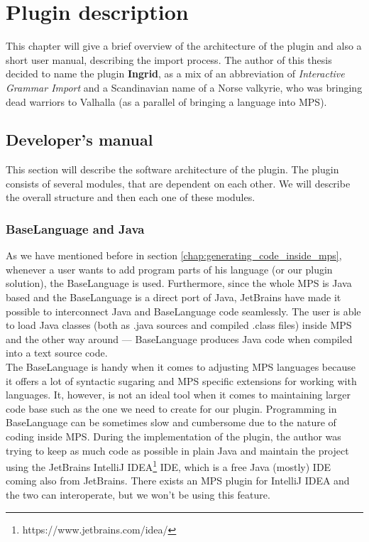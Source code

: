 \chapter{Plugin description}

This chapter will give a brief overview of the architecture of the plugin and also a short user manual, describing the import process.
The author of this thesis decided to name the plugin \textbf{Ingrid}, as a mix of an abbreviation of \textit{Interactive Grammar Import} and a Scandinavian name of a Norse valkyrie, who was bringing dead warriors to Valhalla (as a parallel of bringing a language into MPS).

\section{Developer's manual}

This section will describe the software architecture of the plugin.
The plugin consists of several modules, that are dependent on each other.
We will describe the overall structure and then each one of these modules.

\subsection{BaseLanguage and Java}

As we have mentioned before in section \ref{chap:generating_code_inside_mps}, whenever a user wants to add program parts of his language (or our plugin solution), the BaseLanguage is used.
Furthermore, since the whole MPS is Java based and the BaseLanguage is a direct port of Java, JetBrains have made it possible to interconnect Java and BaseLanguage code seamlessly.
The user is able to load Java classes (both as .java sources and compiled .class files) inside MPS and the other way around --- BaseLanguage produces Java code when compiled into a text source code.
\\

The BaseLanguage is handy when it comes to adjusting MPS languages because it offers a lot of syntactic sugaring and MPS specific extensions for working with languages.
It, however, is not an ideal tool when it comes to maintaining larger code base such as the one we need to create for our plugin.
Programming in BaseLanguage can be sometimes slow and cumbersome due to the nature of coding inside MPS.
During the implementation of the plugin, the author was trying to keep as much code as possible in plain Java and maintain the project using the JetBrains IntelliJ IDEA\footnote{https://www.jetbrains.com/idea/} IDE, which is a free Java (mostly) IDE coming also from JetBrains.
There exists an MPS plugin for IntelliJ IDEA and the two can interoperate, but we won't be using this feature.
\\

